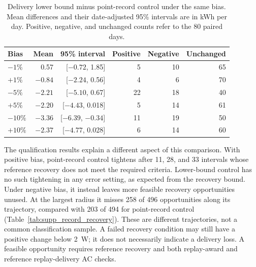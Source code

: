 \documentclass[11pt]{article}
\begin{document}
\begin{table}[!ht]
\centering
\caption{Delivery lower bound minus point-record control under the same bias.
Mean differences and their date-adjusted 95\% intervals are in kWh per day.
Positive, negative, and unchanged counts refer to the 80 paired days.}
\label{tab:supp_record_contrasts}
\vspace{3pt}
\small
\begin{tabular}{@{}lrrrrr@{}}
\toprule
Bias & Mean & 95\% interval & Positive & Negative & Unchanged \\
\midrule
$-1\%$ & 0.57 & [$-0.72$, 1.85] & 5 & 10 & 65 \\
$+1\%$ & $-0.84$ & [$-2.24$, 0.56] & 4 & 6 & 70 \\
$-5\%$ & $-2.21$ & [$-5.10$, 0.67] & 22 & 18 & 40 \\
$+5\%$ & $-2.20$ & [$-4.43$, 0.018] & 5 & 14 & 61 \\
$-10\%$ & $-3.36$ & [$-6.39$, $-0.34$] & 11 & 19 & 50 \\
$+10\%$ & $-2.37$ & [$-4.77$, 0.028] & 6 & 14 & 60 \\
\bottomrule
\end{tabular}
\end{table}

The qualification results explain a different aspect of this comparison.
With positive bias, point-record control tightens after 11, 28, and 33
intervals whose reference recovery does not meet the required criteria.
Lower-bound control has no such tightening in any error setting, as expected
from the recovery bound. Under negative bias, it instead leaves more feasible
recovery opportunities unused. At the largest radius it misses 258 of 496
opportunities along its trajectory, compared with 203 of 494 for point-record
control (Table~\ref{tab:supp_record_recovery}). These are different trajectories,
not a common classification sample. A failed recovery condition may still
have a positive change below 2~W; it does not necessarily indicate a delivery
loss. A feasible opportunity requires reference recovery and both replay-award
and reference replay-delivery AC checks.
\end{document}
